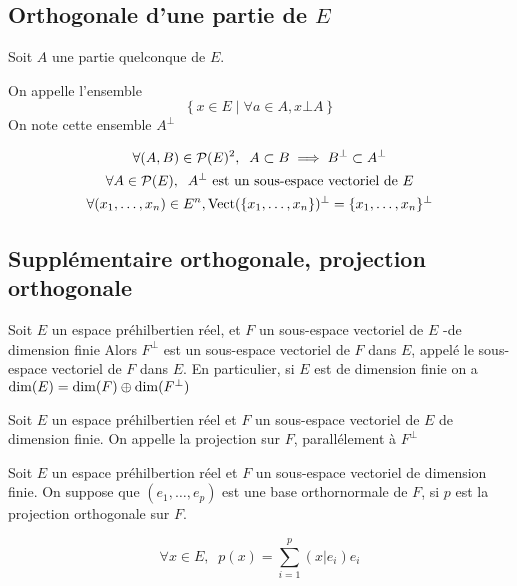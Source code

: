 \subsection{Orthogonale d'une partie de $E$}

\begin{dfn}
Soit $A$ une partie quelconque de $E$.

On appelle  l'ensemble
\[
    \left\{ x \in E \middle| \forall a \in A, x \bot A \right\}
\]
On note cette ensemble $A^\bot$
\end{dfn}

\begin{prp}
\begin{gather*}
    \forall (A, B) \in \mathcal{P}(E)^2, \;\; A \subset B \implies
        B^\bot \subset A^\bot \\
    \forall A \in \mathcal{P}(E), \;\;
        A^\bot \text{ est un sous-espace vectoriel de } E \\
    \forall (x_1, \ldots, x_n) \in E^n,
        \operatorname{Vect}(\{x_1, \ldots, x_n\})^\bot = \{x_1, \ldots, x_n\}^\bot
\end{gather*}
\end{prp}




\subsection{Supplémentaire orthogonale, projection orthogonale}

\begin{thm}
Soit $E$ un espace préhilbertien réel, et $F$ un sous-espace vectoriel
de $E$ \hyp{de dimension finie} Alors $F^\bot$ est un sous-espace vectoriel
de $F$ dans $E$, appelé le sous-espace vectoriel
 de $F$ dans $E$. En particulier, si
$E$ est de dimension finie on a $\operatorname{dim}(E) = \operatorname{dim}(F) \oplus \operatorname{dim}(F^\bot)$
\end{thm}

\begin{dfn}
Soit $E$ un espace préhilbertien réel et $F$ un sous-espace vectoriel de $E$
de dimension finie. On appelle 
la projection sur $F$, parallélement à $F^\bot$
\end{dfn}

\begin{prp}
Soit $E$ un espace préhilbertion réel et $F$ un sous-espace vectoriel de
dimension finie. On suppose que $(e_1, \ldots, e_p)$ est une base orthornormale
de $F$, si $p$ est la projection orthogonale sur $F$.

\[
    \forall x \in E, \;\; p(x) = \sum^p_{i = 1} (x|e_i) e_i
\]
\end{prp}

